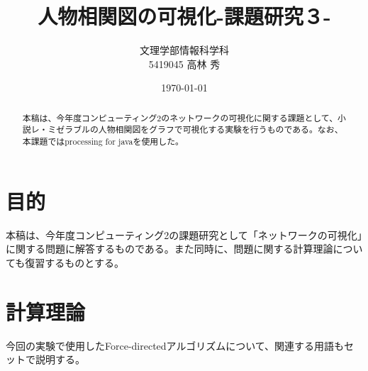 \documentclass[dvipdfmx]{jsarticle}
\title{人物相関図の可視化-課題研究３-}
\author{文理学部情報科学科\\5419045 高林 秀}
\date{\today}
\begin{document}
\maketitle

\begin{abstract}
本稿は、今年度コンピューティング2のネットワークの可視化に関する課題として、小説レ・ミゼラブルの人物相関図をグラフで可視化する実験を行うものである。なお、本課題ではprocessing for javaを使用した。
\end{abstract}

\section{目的}
本稿は、今年度コンピューティング2の課題研究として「ネットワークの可視化」に関する問題に解答するものである。また同時に、問題に関する計算理論についても復習するものとする。
\section{計算理論}
今回の実験で使用したForce-directedアルゴリズムについて、関連する用語もセットで説明する。
\end{document}
